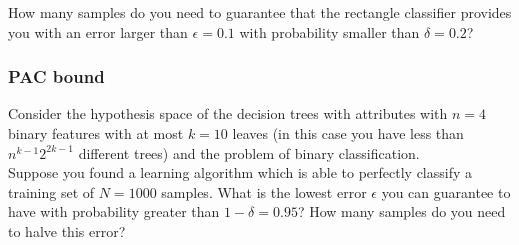     How many samples do you need to guarantee that the rectangle classifier provides you with an error larger than $\epsilon=0.1$ with probability smaller than $\delta=0.2$?


\subsubsection{PAC bound}
    Consider the hypothesis space of the decision trees with attributes with $n=4$ binary features with at most $k=10$ leaves (in this case you have less than $n^{k-1}2^{2k-1}$ different trees) and the problem of binary classification.\\
    Suppose you found a learning algorithm which is able to perfectly classify a training set of $N=1000$ samples. What is the lowest error $\epsilon$ you can guarantee to have with probability greater than $1-\delta=0.95$? How many samples do you need to halve this error?


